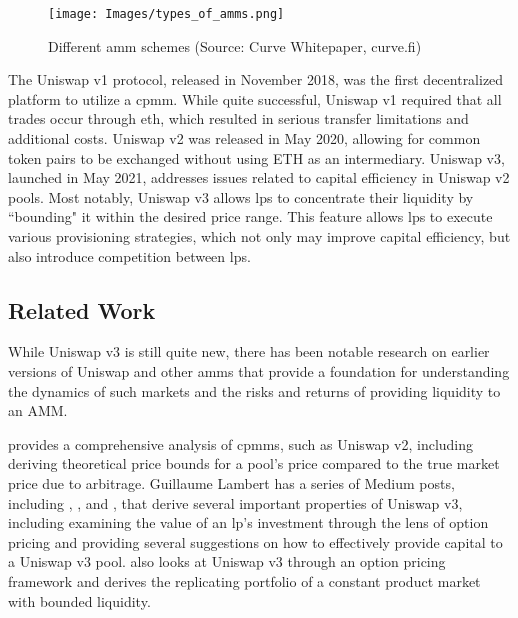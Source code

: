 \documentclass[11pt]{article}
\begin{document}
\begin{figure}[H]
    \centering
    \texttt{[image: Images/types\_of\_amms.png]}
    \caption{Different \gls{amm} schemes (Source: Curve Whitepaper, curve.fi)}
    \label{fig:amm_schemes}
\end{figure}

The Uniswap v1 protocol, released in November 2018, was the first decentralized platform to utilize a \gls{cpmm}. While quite successful, Uniswap v1 required that all trades occur through \gls{eth}, which resulted in serious transfer limitations and additional costs. Uniswap v2 was released in May 2020, allowing for common token pairs to be exchanged without using ETH as an intermediary. Uniswap v3, launched in May 2021, addresses issues related to capital efficiency in Uniswap v2 pools. Most notably, Uniswap v3 allows \glspl{lp} to concentrate their liquidity by ``bounding" it within the desired price range. This feature allows \glspl{lp} to execute various provisioning strategies, which not only may improve capital efficiency, but also introduce competition between \glspl{lp}.

\subsection{Related Work}

While Uniswap v3 is still quite new, there has been notable research on earlier versions of Uniswap and other \glspl{amm} that provide a foundation for understanding the dynamics of such markets and the risks and returns of providing liquidity to an AMM.

\citet{angeris2021analysis} provides a comprehensive analysis of \glspl{cpmm}, such as Uniswap v2, including deriving theoretical price bounds for a pool's price compared to the true market price due to arbitrage. Guillaume Lambert has a series of Medium posts, including \citet{LambertMedium1}, \citet{LambertMedium2}, and \citet{LambertMedium3}, that derive several important properties of Uniswap v3, including examining the value of an \gls{lp}'s investment through the lens of option pricing and providing several suggestions on how to effectively provide capital to a Uniswap v3 pool. \citet{ClarkReplicatingPortfolio} also looks at Uniswap v3 through an option pricing framework and derives the replicating portfolio of a constant product market with bounded liquidity.
\end{document}
